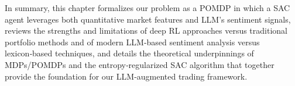 In summary, this chapter formalizes our problem as a \gls{POMDP} in which a \gls{SAC} agent leverages both quantitative market features and \gls{LLM}'s sentiment signals, reviews the strengths and limitations of deep \gls{RL} approaches versus traditional portfolio methods and of modern \gls{LLM}‑based sentiment analysis versus lexicon‑based techniques, and details the theoretical underpinnings of \gls{MDP}s/\gls{POMDP}s and the entropy‑regularized \gls{SAC} algorithm that together provide the foundation for our \gls{LLM}‑augmented trading framework.
